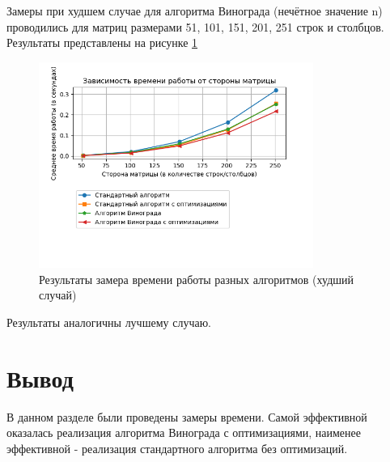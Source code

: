 Замеры при худшем случае для алгоритма Винограда (нечётное значение n) проводились для матриц размерами 51, 101, 151, 201, 251 строк и столбцов. Результаты представлены на рисунке \ref{fig:res2}
\begin{figure}[h!]
	\centering
	\includegraphics[width=0.8\textwidth]{tex_parts/graphicWorst.png}
	\caption{\label{fig:res2} Результаты замера времени работы разных алгоритмов (худший случай)}
\end{figure}

Результаты аналогичны лучшему случаю.

\section{Вывод}

В данном разделе были проведены замеры времени. Самой эффективной оказалась реализация алгоритма Винограда с оптимизациями, наименее эффективной - реализация стандартного алгоритма без оптимизаций. 
